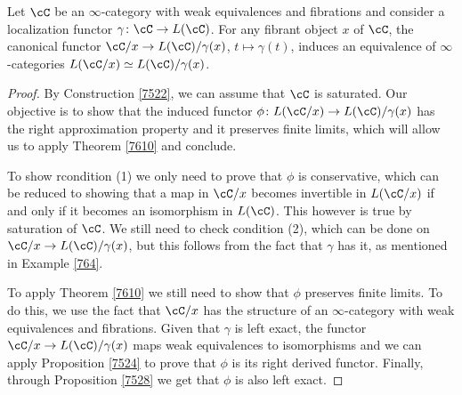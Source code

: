 \begin{cor}\label{7613}

  Let $\cC$ be an $\infty$-category with weak equivalences and fibrations and
  consider a localization functor $\gamma\colon\cC\rightarrow L(\cC)$. For any
  fibrant object $x$ of $\cC$, the canonical functor $\cC/x\rightarrow
  L(\cC)/\gamma(x)$, $t\mapsto\gamma(t)$, induces an equivalence of
  $\infty$-categories $L(\cC/x)\simeq L(\cC)/\gamma(x)$.
\end{cor}
\begin{proof}

  By Construction \ref{7522}, we can assume that $\cC$ is saturated. Our
  objective is to show
  that the induced functor $\phi\colon L(\cC/x)\rightarrow L(\cC)/\gamma(x)$ has
  the right approximation property and it preserves finite limits, which will
  allow us to apply Theorem \ref{7610} and conclude.

  \noindent
  To show rcondition (1) we only need to prove that $\phi$ is conservative, which
  can be reduced to showing that a map in $\cC/x$ becomes invertible in
  $L(\cC/x)$ if and only if it becomes an isomorphism in $L(\cC)$. This however
  is true by
  saturation of $\cC$. We still need to check condition (2), which can be done
  on $\cC/x\rightarrow L(\cC)/\gamma(x)$, but this follows from the fact that
  $\gamma$ has it, as mentioned in Example \ref{764}.

  \noindent
  To apply Theorem \ref{7610} we still need to show that $\phi$ preserves finite
  limits. To do this, we use the fact that $\cC/x$ has the structure of an
  $\infty$-category with weak equivalences and fibrations. Given that $\gamma$
  is left exact, the functor $\cC/x\rightarrow L(\cC)/\gamma(x)$ maps weak
  equivalences to isomorphisms and we can apply Proposition \ref{7524} to prove
  that $\phi$ is its right derived functor. Finally, through Proposition
  \ref{7528} we get that $\phi$ is also left exact.
\end{proof}

